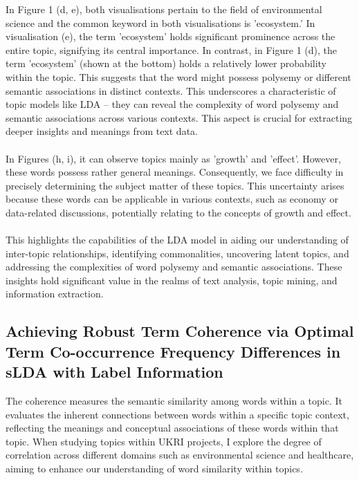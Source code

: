 \documentclass[12pt,twoside]{article}
\begin{document}
In Figure 1 (d, e), both visualisations pertain to the field of environmental science and the common keyword in both visualisations is 'ecosystem.' In visualisation (e), the term 'ecosystem' holds significant prominence across the entire topic, signifying its central importance. In contrast, in Figure 1 (d), the term 'ecosystem' (shown at the bottom) holds a relatively lower probability within the topic. This suggests that the word might possess polysemy or different semantic associations in distinct contexts. This underscores a characteristic of topic models like LDA – they can reveal the complexity of word polysemy and semantic associations across various contexts. This aspect is crucial for extracting deeper insights and meanings from text data.\\\\

In Figures (h, i), it can observe topics mainly as 'growth' and 'effect'. However, these words possess rather general meanings. Consequently, we face difficulty in precisely determining the subject matter of these topics. This uncertainty arises because these words can be applicable in various contexts, such as economy or data-related discussions, potentially relating to the concepts of growth and effect.\\\\


This highlights the capabilities of the LDA model in aiding our understanding of inter-topic relationships, identifying commonalities, uncovering latent topics, and addressing the complexities of word polysemy and semantic associations. These insights hold significant value in the realms of text analysis, topic mining, and information extraction.

\subsection{Achieving Robust Term Coherence via Optimal Term Co-occurrence Frequency Differences in sLDA with Label Information}

The coherence measures the semantic similarity among words within a topic. It evaluates the inherent connections between words within a specific topic context, reflecting the meanings and conceptual associations of these words within that topic. When studying topics within UKRI projects, I explore the degree of correlation across different domains such as environmental science and healthcare, aiming to enhance our understanding of word similarity within topics.\\\\
\end{document}
